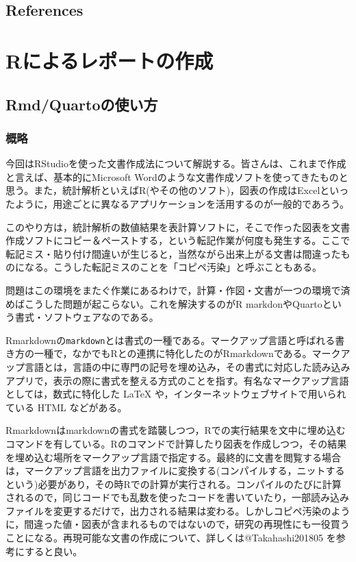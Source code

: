 \documentclass[
  a4paper,
]{ltjsbook}
\begin{document}
\section{References}\label{references-2}



\chapter{Rによるレポートの作成}\label{rux306bux3088ux308bux30ecux30ddux30fcux30c8ux306eux4f5cux6210}

\section{Rmd/Quartoの使い方}\label{rmdquartoux306eux4f7fux3044ux65b9}

\subsection{概略}\label{ux6982ux7565}

今回はRStudioを使った文書作成法について解説する。皆さんは、これまで作成と言えば、基本的にMicrosoft
Wordのような文書作成ソフトを使ってきたものと思う。また，統計解析といえばR(やその他のソフト)，図表の作成はExcelといったように，用途ごとに異なるアプリケーションを活用するのが一般的であろう。

このやり方は，統計解析の数値結果を表計算ソフトに，そこで作った図表を文書作成ソフトにコピー＆ペーストする，という転記作業が何度も発生する。ここで転記ミス・貼り付け間違いが生じると，当然ながら出来上がる文書は間違ったものになる。こうした転記ミスのことを「コピペ汚染」と呼ぶこともある。

問題はこの環境をまたぐ作業にあるわけで，計算・作図・文書が一つの環境で済めばこうした問題が起こらない。これを解決するのがR
markdonやQuartoという書式・ソフトウェアなのである。

Rmarkdownの\texttt{markdown}とは書式の一種である。マークアップ言語と呼ばれる書き方の一種で，なかでもRとの連携に特化したのがRmarkdownである。マークアップ言語とは，言語の中に専門の記号を埋め込み，その書式に対応した読み込みアプリで，表示の際に書式を整える方式のことを指す。有名なマークアップ言語としては，数式に特化した
LaTeX や，インターネットウェブサイトで用いられている HTML などがある。

Rmarkdownはmarkdownの書式を踏襲しつつ，Rでの実行結果を文中に埋め込むコマンドを有している。Rのコマンドで計算したり図表を作成しつつ，その結果を埋め込む場所をマークアップ言語で指定する。最終的に文書を閲覧する場合は，マークアップ言語を出力ファイルに変換する(コンパイルする，ニットするという)必要があり，その時Rでの計算が実行される。コンパイルのたびに計算されるので，同じコードでも乱数を使ったコードを書いていたり，一部読み込みファイルを変更するだけで，出力される結果は変わる。しかしコピペ汚染のように，間違った値・図表が含まれるものではないので，研究の再現性にも一役買うことになる。再現可能な文書の作成について、詳しくは@Takahashi201805
を参考にすると良い。
\end{document}
